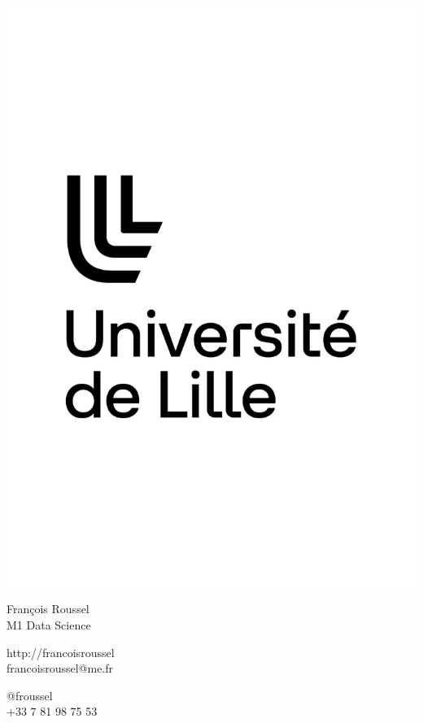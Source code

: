 \documentclass{article}
\begin{document}
\centering \includegraphics[width=.25\linewidth]{logo}\\[5pt]
\parbox{2in}{\Large \centering François Roussel\\[1pt]
\normalsize M1 Data Science}

\vfill
\raggedright
\begin{multicols}{2}
http://francoisroussel\\
francoisroussel@me.fr

\columnbreak
\raggedleft
@froussel\\
+33 7 81 98 75 53%
\end{multicols}%
\end{document}
